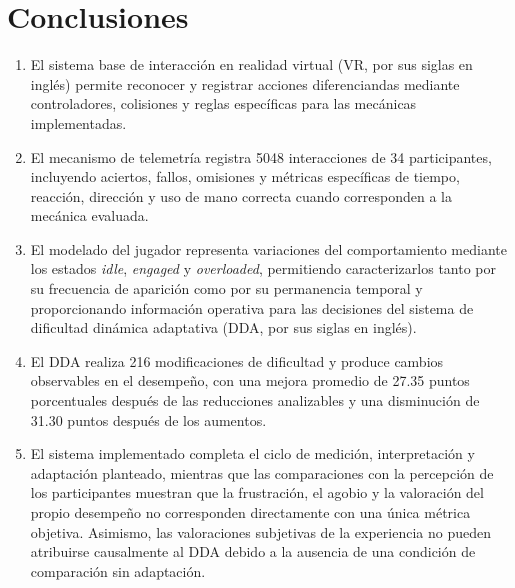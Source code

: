 \chapter{Conclusiones}

\begin{enumerate}
    \item El sistema base de interacción en realidad virtual 
    (VR, por sus siglas en inglés) permite reconocer y registrar acciones
    diferenciandas mediante controladores, colisiones y reglas específicas
    para las mecánicas implementadas.

    \item El mecanismo de telemetría registra 5048 interacciones de 34 
    participantes, incluyendo aciertos, fallos, omisiones y métricas 
    específicas de tiempo, reacción, dirección y uso de mano correcta
    cuando corresponden a la mecánica evaluada.

    \item El modelado del jugador representa variaciones del comportamiento
    mediante los estados \textit{idle}, \textit{engaged} y \textit{overloaded},
    permitiendo caracterizarlos tanto por su frecuencia de aparición como
    por su permanencia temporal y proporcionando información operativa para
    las decisiones del sistema de dificultad dinámica adaptativa (DDA, por
    sus siglas en inglés).

    \item El DDA realiza 216 modificaciones de dificultad y produce cambios
    observables en el desempeño, con una mejora promedio de 27.35 puntos
    porcentuales después de las reducciones analizables y una disminución 
    de 31.30 puntos después de los aumentos. 

    \item El sistema implementado completa el ciclo de medición, 
    interpretación y adaptación planteado, mientras que las comparaciones
    con la percepción de los participantes muestran que la frustración,
    el agobio y la valoración del propio desempeño no corresponden
    directamente con una única métrica objetiva. Asimismo, las valoraciones
    subjetivas de la experiencia no pueden atribuirse causalmente al DDA
    debido a la ausencia de una condición de comparación sin adaptación.
\end{enumerate}